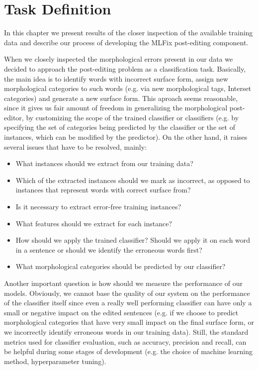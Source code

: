\chapter{Task Definition}
\label{chap:task_descr}

In this chapter we present results of the closer inspection
of the available training data and describe our process of developing
the MLFix post-editing component.


When we closely inspected the morphological errors present in our data we decided
to approach the post-editing problem as a classification task. 
Basically, the main idea is to identify words with incorrect surface form,
assign new morphological categories to such words (e.g. via new morphological tags, Interset
categories) and generate a new surface form.
This aproach seems reasonable, since it gives us fair amount of freedom in generalizing the morphological
post-editor, by customizing the scope of the trained classifier or classifiers (e.g. by specifying the
set of categories being predicted by the classifier or the set of instances, which can be modified by the predictor).
On the other hand, it raises several issues that have to be resolved, mainly:
\begin{itemize}
    \item What instances should we extract from our training data?
    \item Which of the extracted instances should we mark as incorrect, as opposed
        to instances that represent words with correct surface from?
    \item Is it necessary to extract error-free training instances?
    \item What features should we extract for each instance?
    \item How should we apply the trained classifier? Should we apply it
        on each word in a sentence or should we identify the erroneous words
        first?
    \item What morphological categories should be predicted by our classifier?
\end{itemize}

Another important question is how should we measure the performance of our models.
Obviously, we cannot base the quality of our system on the performance of the
classifier itself since even a really well performing classifier can have only a small or negative
impact on the edited sentences (e.g. if we choose to predict morphological categories
that have very small impact on the final surface form, or we incorrectly identify erroneous words
in our training data). Still, the standard metrics
used for classifier evaluation, such as accuracy, precision and recall, can be helpful
during some stages of development (e.g. the choice of machine learning method, hyperparameter tuning).

